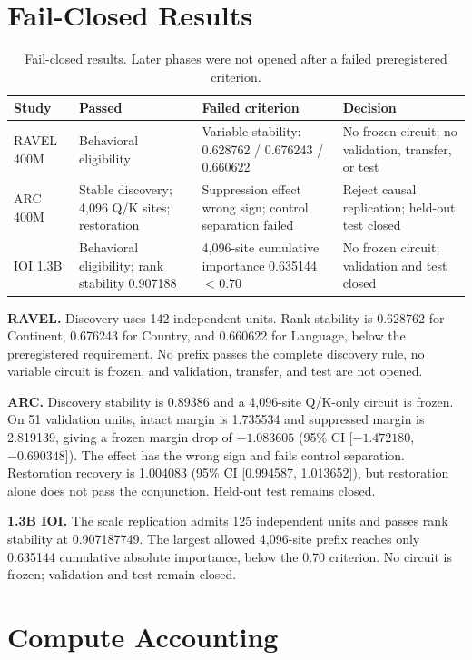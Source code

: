 \documentclass{article}
\newcommand{\smallhead}[1]{\vspace{0.25em}\noindent\textbf{#1}}
\begin{document}
\section{Fail-Closed Results}
\label{app:negative}

\begin{table}[!t]
\centering
\caption{Fail-closed results. Later phases were not opened after a
failed preregistered criterion.}
\label{tab:negative}
\small
\begin{tabularx}{\textwidth}{l l Y Y}
\toprule
Study & Passed & Failed criterion & Decision\\
\midrule
RAVEL 400M & Behavioral eligibility & Variable stability:
0.628762 / 0.676243 / 0.660622 & No frozen circuit; no validation, transfer, or test\\
ARC 400M & Stable discovery; 4,096 Q/K sites; restoration &
Suppression effect wrong sign; control separation failed &
Reject causal replication; held-out test closed\\
IOI 1.3B & Behavioral eligibility; rank stability 0.907188 &
4,096-site cumulative importance 0.635144 \(<0.70\) &
No frozen circuit; validation and test closed\\
\bottomrule
\end{tabularx}
\end{table}

\smallhead{RAVEL.}
Discovery uses 142 independent units. Rank stability is 0.628762 for
Continent, 0.676243 for Country, and 0.660622 for Language, below the
preregistered requirement. No prefix passes the complete discovery rule, no
variable circuit is frozen, and validation, transfer, and test are not opened.

\smallhead{ARC.}
Discovery stability is 0.89386 and a 4,096-site Q/K-only circuit is frozen.
On 51 validation units, intact margin is 1.735534 and suppressed margin is
2.819139, giving a frozen margin drop of \(-1.083605\) (95\% CI
[\(-1.472180\), \(-0.690348\)]). The effect has the wrong sign and fails
control separation. Restoration recovery is 1.004083 (95\% CI
[0.994587, 1.013652]), but restoration alone does not pass the conjunction.
Held-out test remains closed.

\smallhead{1.3B IOI.}
The scale replication admits 125 independent units and passes rank stability
at 0.907187749. The largest allowed 4,096-site prefix reaches only 0.635144
cumulative absolute importance, below the 0.70 criterion. No circuit is frozen;
validation and test remain closed.

\section{Compute Accounting}
\label{app:compute}
\end{document}
